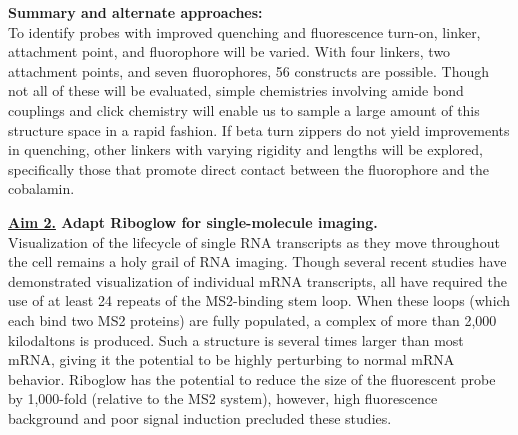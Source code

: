 \textbf{Summary and alternate approaches:}\\
To identify probes with improved quenching and fluorescence turn-on, linker, attachment point, and fluorophore will be varied. With four linkers, two attachment points, and seven fluorophores, 56 constructs are possible. Though not all of these will be evaluated, simple chemistries involving amide bond couplings and click chemistry will enable us to sample a large amount of this structure space in a rapid fashion. If beta turn zippers do not yield improvements in quenching, other linkers with varying rigidity and lengths will be explored,\cite{LeeDesignSynthesisCharacterization2009} specifically those that promote direct contact between the fluorophore and the cobalamin. 

\textbf{\underline{Aim 2.} Adapt Riboglow for single-molecule imaging.}\\
Visualization of the lifecycle of single RNA transcripts as they move throughout the cell remains a holy grail of RNA imaging. Though several recent studies have demonstrated visualization of individual mRNA transcripts, all have required the use of at least 24 repeats of the MS2-binding stem loop.\cite{KatzMappingtranslationhotspots2016,FuscoSinglemRNAMolecules2003,YamagishiSinglemoleculeimagingvactin2009,HalsteadRNAbiosensorimaging2015}
When these loops (which each bind two MS2 proteins) are fully populated, a complex of more than 2,000 kilodaltons is produced.
Such a structure is several times larger than most mRNA, giving it the potential to be highly perturbing to normal mRNA behavior.
Riboglow has the potential to reduce the size of the fluorescent probe by 1,000-fold (relative to the MS2 system), however, high fluorescence background and poor signal induction precluded these studies.\cite{BraselmannDevelopmentriboswitchbasedplatform2017}


